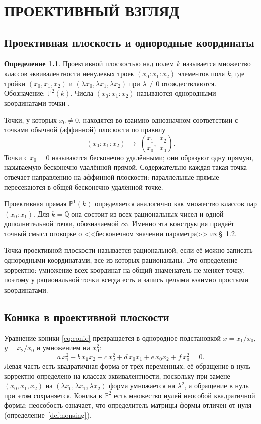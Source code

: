 \documentclass[a4paper,14pt]{extreport}
\theoremstyle{definition}
\newtheorem{defn}[thm]{Определение}
\newcommand{\Q}{\mathbb{Q}}
\newcommand{\PP}{\mathbb{P}}
\begin{document}
\chapter{ПРОЕКТИВНЫЙ ВЗГЛЯД}

\section{Проективная плоскость и однородные координаты}

\begin{defn}
Проективной плоскостью над полем $k$ называется множество классов
эквивалентности ненулевых троек $(x_0:x_1:x_2)$ элементов поля $k$, где тройки
$(x_0,x_1,x_2)$ и $(\lambda x_0,\lambda x_1,\lambda x_2)$ при $\lambda\neq0$
отождествляются. Обозначение: $\PP^2(k)$. Числа $(x_0:x_1:x_2)$ называются
однородными координатами точки \cite[гл.~III, \S~1]{atanasyan}.
\end{defn}

Точки, у которых $x_0\neq0$, находятся во взаимно однозначном соответствии с
точками обычной (аффинной) плоскости по правилу
\[
  (x_0:x_1:x_2)\;\longmapsto\;\left(\frac{x_1}{x_0},\;\frac{x_2}{x_0}\right).
\]
Точки с $x_0=0$ называются бесконечно удалёнными; они образуют одну прямую,
называемую бесконечно удалённой прямой. Содержательно каждая такая точка
отвечает направлению на аффинной плоскости: параллельные прямые пересекаются в
общей бесконечно удалённой точке.

Проективная прямая $\PP^1(k)$ определяется аналогично как множество классов пар
$(x_0:x_1)$. Для $k=\Q$ она состоит из всех рациональных чисел и одной
дополнительной точки, обозначаемой $\infty$. Именно эта конструкция придаёт
точный смысл оговорке о <<бесконечном значении параметра>> из \S~1.2.

Точка проективной плоскости называется рациональной, если её можно записать
однородными координатами, все из которых рациональны. Это определение корректно:
умножение всех координат на общий знаменатель не меняет точку, поэтому у
рациональной точки всегда есть и запись целыми взаимно простыми координатами.

\section{Коника в проективной плоскости}

Уравнение коники \eqref{eq:conic} превращается в однородное подстановкой
$x=x_1/x_0$, $y=x_2/x_0$ и умножением на $x_0^2$:
\[
  a\,x_1^2+b\,x_1x_2+c\,x_2^2+d\,x_0x_1+e\,x_0x_2+f\,x_0^2=0 .
\]
Левая часть есть квадратичная форма от трёх переменных; её обращение в нуль
корректно определено на классах эквивалентности, поскольку при замене
$(x_0,x_1,x_2)$ на $(\lambda x_0,\lambda x_1,\lambda x_2)$ форма умножается на
$\lambda^2$, а обращение в нуль при этом сохраняется. Коника в $\PP^2$ есть
множество нулей неособой квадратичной формы; неособость означает, что
определитель матрицы формы отличен от нуля (определение~\ref{def:nonsing}).
\end{document}
